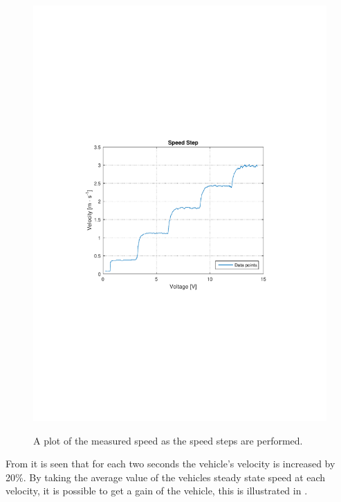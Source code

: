 \begin{figure}[H]
  \centering
  {
    \includegraphics[width=1.4\textwidth]{figures/SpeedStep.pdf}
  }
  \caption{A plot of the measured speed as the speed steps are performed.}
  \label{SpeedStepGainTest}
\end{figure}

From  it is seen that for each two seconds the vehicle's velocity is increased by 20\%. By taking the average value of the vehicles steady state speed at each velocity, it is possible to get a gain of the vehicle, this is illustrated in .

